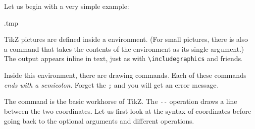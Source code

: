 Let us begin with a very simple example:
%
\begin{VerbatimOut}{\jobname.tmp}
\end{VerbatimOut}
\ShowExample
%
TikZ pictures are defined inside a  environment.
(For small pictures, there is also a  command
that takes the contents of the environment as its single argument.)
The output appears inline in text, just as with \verb|\includegraphics| and friends.

Inside this environment, there are drawing commands.
Each of these commands \emph{ends with a semicolon}.
Forget the \verb|;| and you will get an error message.

The  command is the basic workhorse of TikZ.
The \verb|--| operation draws a line between the two coordinates.
Let us first look at the syntax of coordinates before going back to the optional arguments
and different operations.

